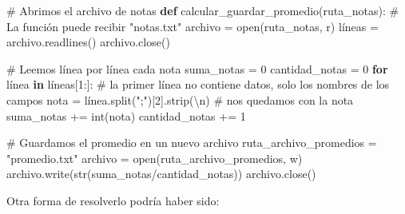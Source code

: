 \documentclass[
  letterpaper,
  DIV=11,
  numbers=noendperiod]{scrreprt}
\newenvironment{Shaded}{\begin{snugshade}}{\end{snugshade}}
\newcommand{\BuiltInTok}[1]{\textcolor[rgb]{0.00,0.23,0.31}{#1}}
\newcommand{\CharTok}[1]{\textcolor[rgb]{0.13,0.47,0.30}{#1}}
\newcommand{\CommentTok}[1]{\textcolor[rgb]{0.37,0.37,0.37}{#1}}
\newcommand{\ControlFlowTok}[1]{\textcolor[rgb]{0.00,0.23,0.31}{\textbf{#1}}}
\newcommand{\DecValTok}[1]{\textcolor[rgb]{0.68,0.00,0.00}{#1}}
\newcommand{\KeywordTok}[1]{\textcolor[rgb]{0.00,0.23,0.31}{\textbf{#1}}}
\newcommand{\NormalTok}[1]{\textcolor[rgb]{0.00,0.23,0.31}{#1}}
\newcommand{\OperatorTok}[1]{\textcolor[rgb]{0.37,0.37,0.37}{#1}}
\newcommand{\StringTok}[1]{\textcolor[rgb]{0.13,0.47,0.30}{#1}}
\begin{document}
\begin{Shaded}
\begin{Highlighting}[]
\CommentTok{\# Abrimos el archivo de notas}
\KeywordTok{def}\NormalTok{ calcular\_guardar\_promedio(ruta\_notas): }\CommentTok{\# La función puede recibir "notas.txt"}
\NormalTok{  archivo }\OperatorTok{=} \BuiltInTok{open}\NormalTok{(ruta\_notas, }\StringTok{\textquotesingle{}r\textquotesingle{}}\NormalTok{)}
\NormalTok{  líneas }\OperatorTok{=}\NormalTok{ archivo.readlines()}
\NormalTok{  archivo.close()}

  \CommentTok{\# Leemos línea por línea cada nota }
\NormalTok{  suma\_notas }\OperatorTok{=} \DecValTok{0}
\NormalTok{  cantidad\_notas }\OperatorTok{=} \DecValTok{0}
  \ControlFlowTok{for}\NormalTok{ línea }\KeywordTok{in}\NormalTok{ líneas[}\DecValTok{1}\NormalTok{:]: }\CommentTok{\# la primer línea no contiene datos, solo los nombres de los campos}
\NormalTok{    nota }\OperatorTok{=}\NormalTok{ línea.split(}\StringTok{";"}\NormalTok{)[}\DecValTok{2}\NormalTok{].strip(}\StringTok{\textquotesingle{}}\CharTok{\textbackslash{}n}\StringTok{\textquotesingle{}}\NormalTok{) }\CommentTok{\# nos quedamos con la nota}
\NormalTok{    suma\_notas }\OperatorTok{+=} \BuiltInTok{int}\NormalTok{(nota)}
\NormalTok{    cantidad\_notas }\OperatorTok{+=} \DecValTok{1}

  \CommentTok{\# Guardamos el promedio en un nuevo archivo}
\NormalTok{  ruta\_archivo\_promedios }\OperatorTok{=} \StringTok{"promedio.txt"}
\NormalTok{  archivo }\OperatorTok{=} \BuiltInTok{open}\NormalTok{(ruta\_archivo\_promedios, }\StringTok{\textquotesingle{}w\textquotesingle{}}\NormalTok{)}
\NormalTok{  archivo.write(}\BuiltInTok{str}\NormalTok{(suma\_notas}\OperatorTok{/}\NormalTok{cantidad\_notas))}
\NormalTok{  archivo.close()}
\end{Highlighting}
\end{Shaded}

Otra forma de resolverlo podría haber sido:
\end{document}
